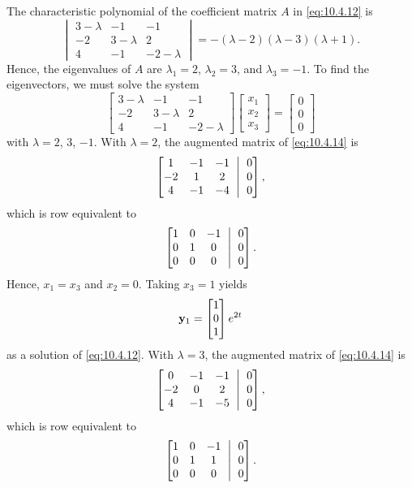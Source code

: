 \begin{alistSolution}
\item The characteristic
polynomial of the  coefficient matrix $A$ in  \eqref{eq:10.4.12} is
\[
\begin{vmatrix}3-\lambda&-1&-1\\-2&3-\lambda&2\\4&-1&-2-\lambda\end{vmatrix}
=-(\lambda-2)(\lambda-3)(\lambda+1).
\]
Hence, the eigenvalues of $A$ are $\lambda_1=2$, $\lambda_2=3$,  and
$\lambda_3=-1$.
To find the  eigenvectors, we must solve the system
\begin{equation}\label{eq:10.4.14}
\begin{bmatrix}3-\lambda&-1&-1\\-2&3-\lambda&2\\4&-1&-2-\lambda\end{bmatrix}
\begin{bmatrix} x_1\\x_2\\x_3\end{bmatrix}
=\begin{bmatrix}0\\0\\0\end{bmatrix}
\end{equation}
with $\lambda=2$, $3$, $-1$.  With $\lambda=2$, the augmented matrix of
\eqref{eq:10.4.14} is
\[
\amatrix{1&-1&-1\\-2&1&2\\4&-1&-4}{0\\0\\0},
\]
which is row equivalent to
\[
\amatrix{1&0&-1\\0&1&0\\0&0&0}{0\\0\\0}.
\]
Hence,  $x_1=x_3$ and $x_2=0$.  Taking $x_3=1$ yields
\[
\mathbf{y}_1=\begin{bmatrix}1\\0\\1\end{bmatrix}e^{2t}
\]
as a solution of  \eqref{eq:10.4.12}.  With $\lambda=3$, the augmented
matrix of  \eqref{eq:10.4.14} is
\[
\amatrix{0&-1&-1\\-2&0& 2\\4&-1&-5}{0\\0\\0},
\]
which is row equivalent to
\[
\amatrix{1&0&-1\\0&1&1\\0&0&0}{0\\0\\0}.
\]
\end{alistSolution}
